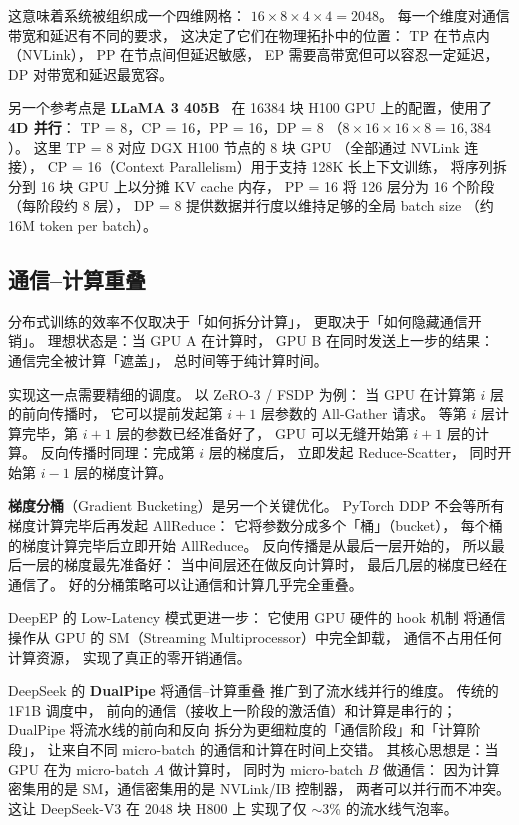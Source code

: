 这意味着系统被组织成一个四维网格：
$16 \times 8 \times 4 \times 4 = 2048$。
每一个维度对通信带宽和延迟有不同的要求，
这决定了它们在物理拓扑中的位置：
TP 在节点内（NVLink），
PP 在节点间但延迟敏感，
EP 需要高带宽但可以容忍一定延迟，
DP 对带宽和延迟最宽容。

另一个参考点是 \textbf{LLaMA 3 405B}~\cite{dubey2024llama3}
在 16384 块 H100 GPU 上的配置，使用了 \textbf{4D 并行}：
TP = 8，CP = 16，PP = 16，DP = 8
（$8 \times 16 \times 16 \times 8 = 16{,}384$）。
这里 TP = 8 对应 DGX H100 节点的 8 块 GPU
（全部通过 NVLink 连接），
CP = 16（Context Parallelism）用于支持 128K 长上下文训练，
将序列拆分到 16 块 GPU 上以分摊 KV cache 内存，
PP = 16 将 126 层分为 16 个阶段（每阶段约 8 层），
DP = 8 提供数据并行度以维持足够的全局 batch size
（约 16M token per batch）。

\subsection{通信--计算重叠}

分布式训练的效率不仅取决于「如何拆分计算」，
更取决于「如何隐藏通信开销」。
理想状态是：当 GPU A 在计算时，
GPU B 在同时发送上一步的结果：
通信完全被计算「遮盖」，
总时间等于纯计算时间。

实现这一点需要精细的调度。
以 ZeRO-3 / FSDP 为例：
当 GPU 在计算第 $i$ 层的前向传播时，
它可以提前发起第 $i+1$ 层参数的 All-Gather 请求。
等第 $i$ 层计算完毕，第 $i+1$ 层的参数已经准备好了，
GPU 可以无缝开始第 $i+1$ 层的计算。
反向传播时同理：完成第 $i$ 层的梯度后，
立即发起 Reduce-Scatter，
同时开始第 $i-1$ 层的梯度计算。

\textbf{梯度分桶}（Gradient Bucketing）是另一个关键优化。
PyTorch DDP 不会等所有梯度计算完毕后再发起 AllReduce：
它将参数分成多个「桶」（bucket），
每个桶的梯度计算完毕后立即开始 AllReduce。
反向传播是从最后一层开始的，
所以最后一层的梯度最先准备好：
当中间层还在做反向计算时，
最后几层的梯度已经在通信了。
好的分桶策略可以让通信和计算几乎完全重叠。

DeepEP 的 Low-Latency 模式更进一步：
它使用 GPU 硬件的 hook 机制
将通信操作从 GPU 的 SM（Streaming Multiprocessor）中完全卸载，
通信不占用任何计算资源，
实现了真正的零开销通信。

DeepSeek 的 \textbf{DualPipe} 将通信--计算重叠
推广到了流水线并行的维度。
传统的 1F1B 调度中，
前向的通信（接收上一阶段的激活值）和计算是串行的；
DualPipe 将流水线的前向和反向
拆分为更细粒度的「通信阶段」和「计算阶段」，
让来自不同 micro-batch 的通信和计算在时间上交错。
其核心思想是：当 GPU 在为 micro-batch $A$ 做计算时，
同时为 micro-batch $B$ 做通信：
因为计算密集用的是 SM，通信密集用的是 NVLink/IB 控制器，
两者可以并行而不冲突。
这让 DeepSeek-V3 在 2048 块 H800 上
实现了仅 $\sim$3\% 的流水线气泡率。

